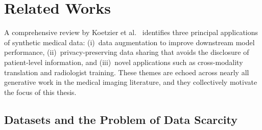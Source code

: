 

\chapter{Related Works}
\label{chap:related_works}

A comprehensive review by Koetzier et al.~\cite{Koetzier2024} identifies three principal
applications of synthetic medical data: (i)~data augmentation to improve downstream model
performance, (ii)~privacy-preserving data sharing that avoids the disclosure of patient-level
information, and (iii)~novel applications such as cross-modality translation and radiologist
training. These themes are echoed across nearly all generative work in the medical imaging
literature, and they collectively motivate the focus of this thesis.

\section{Datasets and the Problem of Data Scarcity}
\label{sec:rw_datasets}

